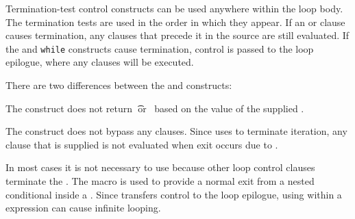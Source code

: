 Termination-test control constructs can be used anywhere within the loop body.
The termination tests are used in the order in which they appear.
If an  or  clause causes
termination, any clauses that precede it in the source
are still evaluated.  
If the  and {\tt while} constructs cause termination,
control is passed to the loop epilogue, where any 
clauses will be executed.  
 
There are two differences between the  and 
constructs: 
 
\beginlist
\itemitem{\bull} The  construct does not return 
\t\ or \nil\ based on the value of the supplied .
                                                       
\itemitem{\bull} 
The  construct 
does not bypass any  clauses.
Since  uses 
to terminate iteration,
any  clause that is supplied is not evaluated
when exit occurs due to . 
\endlist




In most cases it is not necessary to use 
because other loop control clauses terminate the .  
The macro  is used to provide a normal exit
from a nested conditional inside a .
Since  transfers control to the loop epilogue,
using  within a  expression can cause
infinite looping.

